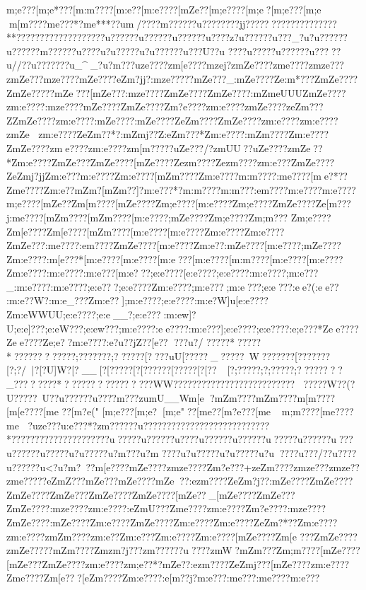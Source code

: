 {{{{{{{{{{{{{{{{{{{{{m;e???[m;e*???[m:m????[m:e??[m:e????[mZe??[m;e????[m;e  ?[m;e ???[m;e 
 {m[m????{m{e???*?m{e***??u{m/???}?m?????}?u?????}???jj???????????????????**????????}??????}?????u?????}?u?????}?u?????}?u????z}?u?????}?u???_?u?u?????}?u?????}?m?????}?u????u?u?????u?u?????}?u???U?}?u 
???}?u ????}?u?????}?u????}?u//??u?}?????}?u_^_?u?m ???uze????zm[e????{mzej?zmZe????zm{e????zmze???zmZe???{mze????{mZe????{eZm?jj?:mze?????mZe???_:mZe????Ze:m*???ZmZe????ZmZe?????mZe???[mZe???}:mze????ZmZe????ZmZe????:mZmeUUUZmZe????zm:e????:mze????{mZe????ZmZe????Zm?e????zm:e????zmZe????zeZm???ZZmZe????zm:e????:mZe????:mZe????ZeZm????ZmZe????zm:e????zm:e????zmZe 
zm:e????ZeZm??*?:mZmj??Z:eZm???*Zm:e????:mZm????Zm:e????ZmZe????zme????zm:e????zm[m?????uZe???/?}zmUU??uZe????zmZe??*Zm:e????ZmZe???ZmZe????[mZe????Zezm????Zezm????zm:e???ZmZe????ZeZmj?jjZm:e???{m:e????Zm:e????[mZm????Zm:e????{m:m????:m{e????[me?*??Zm{e????Zm:e??{mZm}}}?[mZm??]?{m:e???*?m:m????{m:m???:e{m????{m:e????{m:e????{m;e????[mZe??Zm[m????[mZe????Zm;e????[m:e????Zm;e????ZmZe????Ze[m???j:m{e????[mZm????[mZm????[m:e????;mZe????Zm;e????Zm;m??? Zm;e????Zm[e????Zm[e????[mZm????[m:e????[m:e????Zm:e????Zm:e????ZmZe???:m{e????:e{m????ZmZe????[m:e????Zm:e??:mZe????[m:e????;mZe????Zm:e????:m[e???*[m:e????[m:e????[m:e???[m:e????[m:m????[m:e????[m:e????Zm:e????:m:e????:m:e???[m:e???;e:e????[e:e????;e:e????:m:e????;m:e???_:m:e????:m:e????;e:e???;e:e????Zm:e????;m:e???;m:e???;e:e???:ee?(  :ee??  :m:e??W?:m:e_???Zm:e??];m:e????;e:e????:m:e?W]u[e:e????Zm:eWWUU;e:e????;e:e__?;e:e???:m:ew]?U;e:e]???;e:eW???;e:ew???;m:e????:ee????:m:e???];e:e????;e:e????:e;e???*Zee????Zee????Ze;e? ?{m:e????:e?u??jZ??[e??
???u?/
 ???}??* ??}???*??}??????????;???????;??????[????uU[?????_?????~W???????[???????[?;?/ |?[?U]W?\?[?__[?[?????[?[?????{?[?????[?[??~[?;?????;?;?????;????????_????????*????????????????WW????  ??????????????????????
 ???} ??W??} (?U???}??~U?}?u?????}?u????}{m???z{u{mU__W{m[e  ?{mZm????{mZm????{m[m????[m[e????[m{e  ??[m?e("
 [m;e??? [m;e? [m;e"??[m{e  ??[m?e ???[m{e{m;m????[m{e????{m{e  ?uze???u:e???*?}zm??????u???????}??????}?????????????}?*????}??????}?????}??????u????}?u?????}?u???}?u?????}?u?????}?u?????u??????u???u?????}?u?????u?u?????u?m???u?m
????u?u?????u?u?????u?u???}?u???/?}?u??  ??u?????}?u^^|?u?m?~??m[e????{mZe????zmze????Zm?e???+zeZm????zmze???zmze??zm{e?????eZmZ???{mZe???{mZe????mZe??:ezm????ZeZm?j??:mZe????ZmZe????ZmZe????ZmZe???ZmZe????ZmZe????[mZe??_[mZe????ZmZe???ZmZe????:mze????zm:e????:eZmU???Zm{e????zm:e????Zm?e????:mze????ZmZe????:mZe????Zm:e????ZmZe????Zm:e????Zm:e????ZeZm?*??Zm:e????zm:e????zmZm????zm:e??Zm:e???Zm:e????Zm:e????[mZe????Zm[e ???ZmZe????zmZe?????mZm????Zmzm?j???}zm?????}?u????}zmW^^^?mZm}???Zm;m????[mZe????[mZe???ZmZe????zm:e????zm;e??*?{mZe??:ezm????ZeZmj???[mZe????zm:e????Zm{e????Zm[e???[eZm????Zm:e????:e[m??j?{m:e???:m{e???:m{e????{m:e???
}}}}}}}}}}}}}}}}}}
